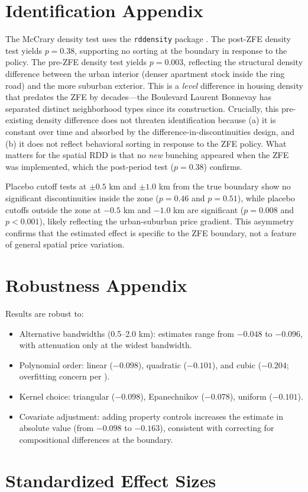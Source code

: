 \documentclass[12pt]{article}
\begin{document}
\section{Identification Appendix}

The McCrary density test \citep{mccrary2008manipulation} uses the \texttt{rddensity} package \citep{cattaneo2020simple}. The post-ZFE density test yields $p = 0.38$, supporting no sorting at the boundary in response to the policy. The pre-ZFE density test yields $p = 0.003$, reflecting the structural density difference between the urban interior (denser apartment stock inside the ring road) and the more suburban exterior. This is a \textit{level} difference in housing density that predates the ZFE by decades---the Boulevard Laurent Bonnevay has separated distinct neighborhood types since its construction. Crucially, this pre-existing density difference does not threaten identification because (a) it is constant over time and absorbed by the difference-in-discontinuities design, and (b) it does not reflect behavioral sorting in response to the ZFE policy. What matters for the spatial RDD is that no \textit{new} bunching appeared when the ZFE was implemented, which the post-period test ($p = 0.38$) confirms.

Placebo cutoff tests at $\pm 0.5$ km and $\pm 1.0$ km from the true boundary show no significant discontinuities inside the zone ($p = 0.46$ and $p = 0.51$), while placebo cutoffs outside the zone at $-0.5$ km and $-1.0$ km are significant ($p = 0.008$ and $p < 0.001$), likely reflecting the urban-suburban price gradient. This asymmetry confirms that the estimated effect is specific to the ZFE boundary, not a feature of general spatial price variation.

\section{Robustness Appendix}

Results are robust to:
\begin{itemize}
\item Alternative bandwidths (0.5--2.0 km): estimates range from $-0.048$ to $-0.096$, with attenuation only at the widest bandwidth.
\item Polynomial order: linear ($-0.098$), quadratic ($-0.101$), and cubic ($-0.204$; overfitting concern per \citet{gelman2019high}).
\item Kernel choice: triangular ($-0.098$), Epanechnikov ($-0.078$), uniform ($-0.101$).
\item Covariate adjustment: adding property controls increases the estimate in absolute value (from $-0.098$ to $-0.163$), consistent with correcting for compositional differences at the boundary.
\end{itemize}

\section{Standardized Effect Sizes}
\label{sec:sde}


\end{document}
